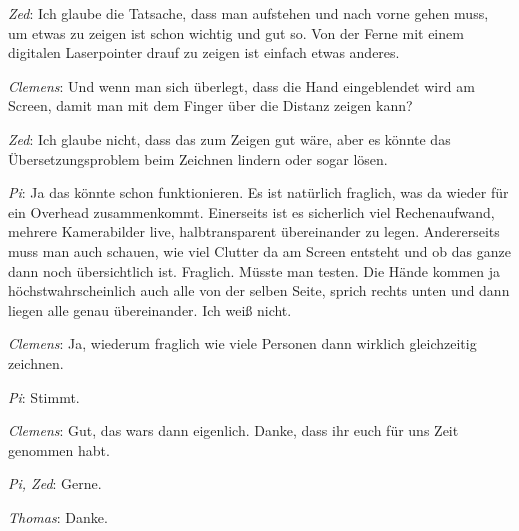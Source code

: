 \medskip \emph{Zed}: Ich glaube die Tatsache, dass man aufstehen und nach vorne gehen muss, um etwas zu zeigen ist schon wichtig und gut so. Von der Ferne mit einem digitalen Laserpointer drauf zu zeigen ist einfach etwas anderes. 

\medskip \emph{Clemens}: Und wenn man sich überlegt, dass die Hand eingeblendet wird am Screen, damit man mit dem Finger über die Distanz zeigen kann?

\medskip \emph{Zed}: Ich glaube nicht, dass das zum Zeigen gut wäre, aber es könnte das Übersetzungsproblem beim Zeichnen lindern oder sogar lösen.

\medskip \emph{Pi}: Ja das könnte schon funktionieren. Es ist natürlich fraglich, was da wieder für ein Overhead zusammenkommt. Einerseits ist es sicherlich viel Rechenaufwand, mehrere Kamerabilder live, halbtransparent übereinander zu legen. Andererseits muss man auch schauen, wie viel Clutter da am Screen entsteht und ob das ganze dann noch übersichtlich ist. Fraglich. Müsste man testen. Die Hände kommen ja höchstwahrscheinlich auch alle von der selben Seite, sprich rechts unten und dann liegen alle genau übereinander. Ich weiß nicht.

\medskip \emph{Clemens}: Ja, wiederum fraglich wie viele Personen dann wirklich gleichzeitig zeichnen.

\medskip \emph{Pi}: Stimmt.

\medskip \emph{Clemens}: Gut, das wars dann eigenlich. Danke, dass ihr euch für uns Zeit genommen habt.

\medskip \emph{Pi, Zed}: Gerne.

\medskip \emph{Thomas}: Danke.

















